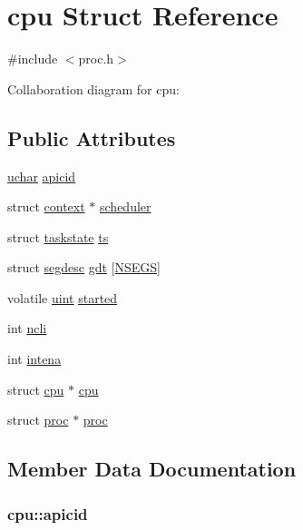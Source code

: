 \hypertarget{structcpu}{}\section{cpu Struct Reference}
\label{structcpu}


{\ttfamily \#include $<$proc.\+h$>$}



Collaboration diagram for cpu\+:
\subsection*{Public Attributes}
\begin{DoxyCompactItemize}
\item 
\hyperlink{custom__types_8h_a65f85814a8290f9797005d3b28e7e5fc}{uchar} \hyperlink{structcpu_ad08a3478ec15fc8bec1d9b6b5a0431db}{apicid}
\item 
struct \hyperlink{structcontext}{context} $\ast$ \hyperlink{structcpu_aaa1510fdf8a2230c033d04e13e4fdd9e}{scheduler}
\item 
struct \hyperlink{structtaskstate}{taskstate} \hyperlink{structcpu_a32e7b5aa877171c943d47038e818a159}{ts}
\item 
struct \hyperlink{structsegdesc}{segdesc} \hyperlink{structcpu_aee38fb8832f8e728538b2cee877d1c09}{gdt} \mbox{[}\hyperlink{mmu_8h_a2fca412c6ed6584438e96f43ccce030a}{N\+S\+E\+GS}\mbox{]}
\item 
volatile \hyperlink{custom__types_8h_a91ad9478d81a7aaf2593e8d9c3d06a14}{uint} \hyperlink{structcpu_a869f6e0e1dbf69de0bdb3546f981847f}{started}
\item 
int \hyperlink{structcpu_a9ccad8ae031c295f86e96de26df24805}{ncli}
\item 
int \hyperlink{structcpu_a26fc271fea8af30d67fc2ae22ef0a82f}{intena}
\item 
struct \hyperlink{structcpu}{cpu} $\ast$ \hyperlink{structcpu_a96823491c316b96bdd2fb80fa8e270f9}{cpu}
\item 
struct \hyperlink{structproc}{proc} $\ast$ \hyperlink{structcpu_a9e71a6265904fd644875a9ea5a413c89}{proc}
\end{DoxyCompactItemize}


\subsection{Member Data Documentation}
\subsubsection[{\texorpdfstring{apicid}{apicid}}]{ cpu\+::apicid}\hypertarget{structcpu_ad08a3478ec15fc8bec1d9b6b5a0431db}{}\label{structcpu_ad08a3478ec15fc8bec1d9b6b5a0431db}

